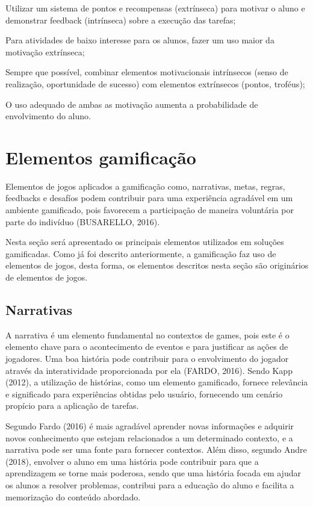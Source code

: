 \documentclass[
	12pt,				%
	oneside,			%
	a4paper,			%
	english,			%
	french,				%
	spanish,			%
	brazil,				%
	]{abntex2}
\begin{document}
Utilizar um sistema de pontos e recompensas (extrínseca) para motivar o aluno e demonstrar feedback (intrínseca) sobre a execução das tarefas;

Para atividades de baixo interesse para os alunos, fazer um uso maior da motivação extrínseca;

Sempre que possível, combinar elementos motivacionais intrínsecos (senso de realização, oportunidade de sucesso) com elementos extrínsecos (pontos, troféus);

O uso adequado de ambas as motivação aumenta a probabilidade de envolvimento do aluno.
  
\section{Elementos gamificação}

Elementos de jogos aplicados a gamificação como, narrativas, metas, regras, feedbacks e desafíos podem contribuir para uma experiência agradável em um ambiente gamificado, pois favorecem a participação de maneira voluntária por parte do indivíduo (BUSARELLO, 2016).

Nesta seção será apresentado os principais elementos utilizados em soluções gamificadas. Como já foi descrito anteriormente, a gamificação faz uso de elementos de jogos, desta forma, os elementos descritos nesta seção são originários de elementos de jogos.

\subsection{Narrativas}

A narrativa é um elemento fundamental no contextos de games, pois este é o elemento chave para o acontecimento de eventos e para justificar as ações de jogadores. Uma boa história pode contribuir para o envolvimento do jogador através da interatividade proporcionada por ela  (FARDO, 2016). Sendo Kapp (2012), a utilização de histórias, como um elemento gamificado, fornece relevância e significado para experiências obtidas pelo usuário, fornecendo um cenário propício para a aplicação de tarefas.

Segundo Fardo (2016) é mais agradável aprender novas informações e adquirir novos conhecimento que estejam relacionados a um determinado contexto, e a narrativa pode ser uma fonte para fornecer contextos. Além disso, segundo Andre (2018), envolver o aluno em uma história pode contribuir para que a aprendizagem se torne mais poderosa, sendo que uma história focada em ajudar os alunos a resolver problemas, contribui para a educação do aluno e facilita a memorização do conteúdo abordado.
\end{document}
